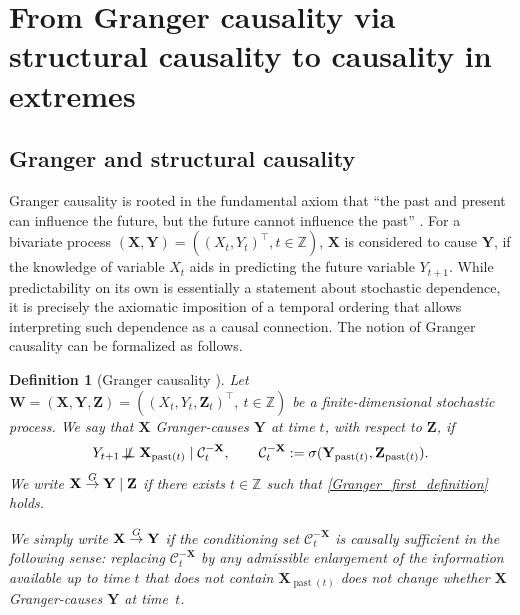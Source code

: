 \documentclass[a4paper,11pt]{article}
\newtheorem{definition}{Definition}
\newcommand{\indep}{\perp\kern-5.5pt\perp}
\newcommand{\notindep}{\not\!\indep}
\newcommand{\toverset}[2]{\overset{{\rm #1}}{#2}}
\DeclareMathOperator{\past}{past}
\begin{document}
\section{From Granger causality via structural causality to causality in extremes}
\label{section2}

\subsection{Granger and structural causality}\label{section_granger_struct_def}

Granger causality is rooted in the fundamental axiom that ``the past and present can influence the future, but the future cannot influence the past'' \citep{GRANGER1980329}. For a bivariate process  $(\textbf{X},\textbf{Y})=( (X_t, Y_t)^\top, t\in\mathbb{Z})$, $\textbf{X}$ is considered to cause $\textbf{Y}$, if the knowledge of variable $X_t$ aids in predicting the future variable $Y_{t+1}$. While predictability on its own is essentially a statement about stochastic dependence, it is precisely the axiomatic imposition of a temporal ordering that allows interpreting such dependence as a causal connection. The notion of Granger causality can be formalized as follows.

\begin{definition}[Granger causality \citep{GRANGER1980329}]\label{DEF1}
Let \(\mathbf W=(\mathbf X,\mathbf Y,\mathbf Z)=((X_t,Y_t,\mathbf Z_t)^\top,\ t\in\mathbb Z)\) be a finite-dimensional stochastic process. We say that \(\mathbf X\) Granger-causes \(\mathbf Y\) at time \(t\), with respect to \(\mathbf Z\), if
\begin{equation}\label{Granger_first_definition}
    Y_{t+1}\notindep \mathbf X_{\past(t)}
    \mid \mathcal C_t^{-\mathbf X}, 
    \qquad 
    \mathcal C_t^{-\mathbf X}:=\sigma(\mathbf Y_{\past(t)},\mathbf Z_{\past(t)}).
\end{equation}
We write \(\mathbf X\toverset{G}{\to}\mathbf Y\mid\mathbf Z\) if there exists \(t\in\mathbb Z\) such that \eqref{Granger_first_definition} holds.

We simply write \(\mathbf X\toverset{G}{\to}\mathbf Y\) if the conditioning set \(\mathcal C_t^{-\mathbf X}\) is causally sufficient in the following sense: replacing \(\mathcal C_t^{-\mathbf X}\) by any admissible enlargement of the information available up to time \(t\) that does not contain \(\mathbf X_{\past(t)}\) does not change whether \(\mathbf X\) Granger-causes \(\mathbf Y\) at time~\(t\). 
\end{definition}
\end{document}
